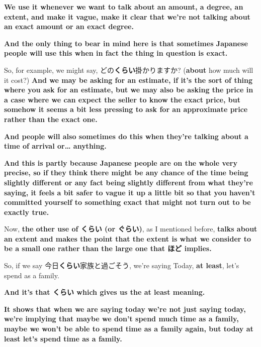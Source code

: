 {}

{\bf We use it whenever we want to talk about an amount, a degree, an extent, and make it vague, make it clear that we're not talking about an exact amount or an exact degree.}

\thinrule

{\bf And the only thing to bear in mind here is that sometimes Japanese people will use this when in fact the thing in question is exact.}

So, for example, we might say, どの{\bf くらい}掛かりますか? ({\bf about} how much will it cost?) {\bf And we may be asking for an estimate, if it's the sort of thing where you ask for an estimate, but we may also be asking the price in a case where we can expect the seller to know the exact price, but somehow it seems a bit less pressing to ask for an approximate price rather than the exact one.}

\thinrule

{\bf And people will also sometimes do this when they're talking about a time of arrival or\ldots{} anything.}

{\bf And this is partly because Japanese people are on the whole very precise, so if they think there might be any chance of the time being slightly different or any fact being slightly different from what they're saying, it feels a bit safer to vague it up a little bit so that you haven't committed yourself to something exact that might not turn out to be exactly true.}

\startsectionlevel[title={くらい as a small extent of something = at least},reference={くらい-as-a-small-extent-of-something-at-least}]

Now, {\bf the other use of くらい (or ぐらい)}, as I mentioned before, {\bf talks about an extent and makes the point that the extent is what we consider to be a small one rather than the large one that ほど implies.}

So, if we say 今日{\bf くらい}家族と過ごそう, we're saying Today, {\bf at least}, let's spend as a family.

{}

{\bf And it's that くらい which gives us the at least meaning.}

{\bf It shows that when we are saying today we're not just saying today, we're implying that maybe we don't spend much time as a family, maybe we won't be able to spend time as a family again, but today at least let's spend time as a family.}

